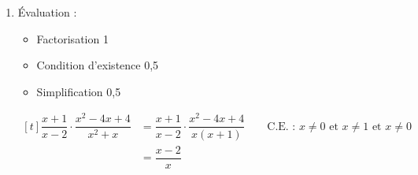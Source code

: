 %
%
    \begin{enumerate}
        \item
              Évaluation :
              \begin{itemize}
                  \item Factorisation \hfill 1
                  \item Condition d'existence \hfill 0,5
                  \item Simplification \hfill 0,5
              \end{itemize}
              $\begin{aligned}[t]
                      \dfrac{x+1}{x-2}\cdot\dfrac{x^2-4x+4}{x^2 + x} & = \dfrac{x+1}{x-2}\cdot\dfrac{x^2-4x+4}{x(x+1)} \qquad \text{C.E. : } x\ne 0 \text{ et } x\ne 1 \text{ et } x\ne 0 \\
                                                                     & =\dfrac{x-2}{x}
                  \end{aligned}$

    \end{enumerate}
